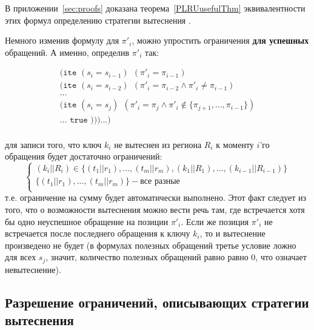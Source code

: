 В приложении~\ref{sec:proofs} доказана теорема~\ref{PLRUusefulThm} эквивалентности этих формул определению стратегии вытеснения \PseudoLRU.

Немного изменив формулу для $\pi'_i$, можно упростить ограничения \textbf{для успешных} обращений. А именно, определив $\pi'_i$ так:

$$
\begin{array}{l}
\texttt{(ite~} (s_i = s_{i-1}) ~~ (\pi'_i = \pi_{i-1})\\
\texttt{(ite~} (s_i = s_{i-2}) ~~ (\pi'_i = \pi_{i-2} \wedge \pi'_i \neq \pi_{i-1})\\
...\\
\texttt{(ite~} (s_i = s_j) ~~ (\pi'_i = \pi_j \wedge \pi'_i \notin \{\pi_{j+1}, ..., \pi_{i-1}\})\\
... \texttt{~true )))...)}\\
\end{array}
$$

для записи того, что ключ $k_i$ не вытеснен из региона $R_i$ к моменту $i$'го обращения будет достаточно ограничений:
$$
\left\{\begin{array}{l}
(k_i||R_i) \in \{(t_1||r_1), ..., (t_m||r_m), (k_1||R_1), ..., (k_{i-1}||R_{i-1})\}\\
\{(t_1||r_1), ..., (t_m||r_m)\} - \mbox{все разные}\\
\end{array} \right.
$$
т.е. ограничение на сумму будет автоматически выполнено. Этот факт следует из того, что о возможности вытеснения можно вести речь там, где встречается хотя бы одно неуспешное обращение на позиции $\pi'_i$. Если же позиция $\pi'_i$ не встречается после последнего обращения к ключу $k_i$, то и вытеснение произведено не будет (в формулах полезных обращений третье условие ложно для всех $s_j$, значит, количество полезных обращений равно равно 0, что означает невытеснение).

\subsection{Разрешение ограничений, описывающих стратегии вытеснения}

